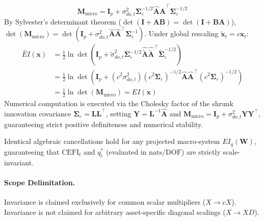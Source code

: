 \documentclass[12pt]{article}
\begin{document}
\begin{enumerate}
    \begin{equation}
    \mathbf{M}_{\text{micro}} = \mathbf{I}_p + \sigma_{do,t}^2 \boldsymbol{\Sigma}_\varepsilon^{-1/2} \hat{\mathbf{A}}\hat{\mathbf{A}}^\top \boldsymbol{\Sigma}_\varepsilon^{-1/2}
    \end{equation}
    By Sylvester's determinant theorem ($\det(\mathbf{I} + \mathbf{A}\mathbf{B}) = \det(\mathbf{I} + \mathbf{B}\mathbf{A})$), $\det(\mathbf{M}_{\text{micro}}) = \det(\mathbf{I}_p + \sigma_{do,t}^2 \hat{\mathbf{A}}\hat{\mathbf{A}}^\top \boldsymbol{\Sigma}_\varepsilon^{-1})$. Under global rescaling $\tilde{\mathbf{x}}_t = c \mathbf{x}_t$:
    \begin{align}
    \widetilde{EI}(\mathbf{x}) &= \frac{1}{2} \ln \det \left( \mathbf{I}_p + \tilde{\sigma}_{do,t}^2 \boldsymbol{\Sigma}_\varepsilon^{-1/2} \hat{\tilde{\mathbf{A}}}\hat{\tilde{\mathbf{A}}}^\top \tilde{\boldsymbol{\Sigma}}_\varepsilon^{-1/2} \right) \nonumber \\
    &= \frac{1}{2} \ln \det \left( \mathbf{I}_p + (c^2 \sigma_{do,t}^2) (c^2 \boldsymbol{\Sigma}_\varepsilon)^{-1/2} \hat{\mathbf{A}}\hat{\mathbf{A}}^\top (c^2 \boldsymbol{\Sigma}_\varepsilon)^{-1/2} \right) \nonumber \\
    &= \frac{1}{2} \ln \det \left( \mathbf{M}_{\text{micro}} \right) = EI(\mathbf{x})
    \end{align}
    Numerical computation is executed via the Cholesky factor of the shrunk innovation covariance $\boldsymbol{\Sigma}_\varepsilon = \mathbf{L}\mathbf{L}^\top$, setting $\mathbf{Y} = \mathbf{L}^{-1}\hat{\mathbf{A}}$ and $\mathbf{M}_{\text{micro}} = \mathbf{I}_p + \sigma_{do,t}^2 \mathbf{Y}\mathbf{Y}^\top$, guaranteeing strict positive definiteness and numerical stability.
\end{enumerate}
Identical algebraic cancellations hold for any projected macro-system $EI_q(\mathbf{W})$, guaranteeing that $\mathrm{CEFI}_t$ and $q_t^*$ (evaluated in $\mathrm{nats/DOF}$) are strictly scale-invariant.

\paragraph{Scope Delimitation.} Invariance is claimed exclusively for common scalar multipliers ($X \to c X$). Invariance is not claimed for arbitrary asset-specific diagonal scalings ($X \to X D$).
\end{document}
